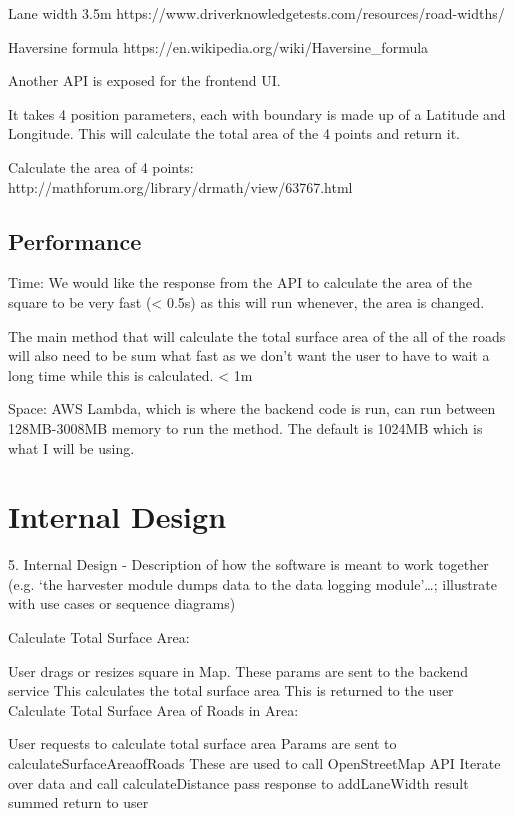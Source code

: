 \documentclass[a4paper,11pt]{article}
\begin{document}
Lane width 3.5m https://www.driverknowledgetests.com/resources/road-widths/

Haversine formula https://en.wikipedia.org/wiki/Haversine_formula

Another API is exposed for the frontend UI.

It takes 4 position parameters, each with boundary is made up of a Latitude and Longitude. This will calculate the total area of the 4 points and return it.

Calculate the area of 4 points:
http://mathforum.org/library/drmath/view/63767.html

\subsection{Performance}


Time:
We would like the response from the API to calculate the area of the square to be very fast (< 0.5s) as this will run whenever, the area is changed.

The main method that will calculate the total surface area of the all of the roads will also need to be sum what fast as we don't want the user to have to wait a long time while this is calculated. < 1m

Space:
AWS Lambda, which is where the backend code is run, can run between 128MB-3008MB memory to run the method. The default is 1024MB which is what I will be using.


\section{Internal Design}

5. Internal Design - Description of how the software is meant to work together (e.g. ‘the harvester module dumps data to the data logging module’…; illustrate with use cases or sequence diagrams)


Calculate Total Surface Area:

User drags or resizes square in Map.
These params are sent to the backend service
This calculates the total surface area
This is returned to the user
Calculate Total Surface Area of Roads in Area:

User requests to calculate total surface area
Params are sent to calculateSurfaceAreaofRoads
These are used to call OpenStreetMap API
Iterate over data and call calculateDistance
pass response to addLaneWidth
result summed
return to user
\end{document}
